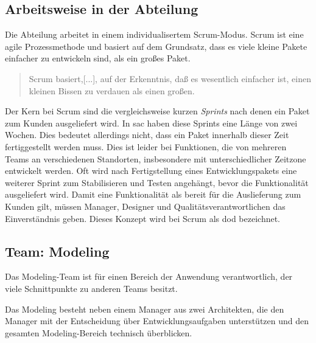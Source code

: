 \subsection{Arbeitsweise in der Abteilung}
Die Abteilung arbeitet in einem individualisertem Scrum-Modus. Scrum ist eine agile Prozessmethode und basiert 
auf dem Grundsatz, dass es viele kleine Pakete einfacher zu entwickeln sind, als ein großes Paket. 
\begin{quote} Scrum basiert,[...], auf der Erkenntnis, daß es wesentlich einfacher ist, einen kleinen Bissen zu verdauen als einen großen.\cite{scrum:2018} \end{quote} 
Der Kern bei Scrum sind die vergleichsweise kurzen \textit{Sprints} nach denen ein Paket zum Kunden ausgeliefert wird. 
In \ac{sac} haben diese Sprints eine Länge von zwei Wochen. Dies bedeutet allerdings nicht, dass ein Paket 
innerhalb dieser Zeit fertiggestellt werden muss. Dies ist leider bei Funktionen, die von mehreren Teams an
verschiedenen Standorten, insbesondere mit unterschiedlicher Zeitzone entwickelt werden. Oft wird nach Fertigstellung eines 
Entwicklungspakets eine weiterer Sprint zum Stabilisieren und Testen angehängt, bevor die Funktionalität ausgeliefert wird.
Damit eine Funktionalität als bereit für die Auslieferung zum Kunden gilt, müssen Manager, Designer und Qualitätsverantwortlichen das 
Einverständnis geben. Dieses Konzept wird bei Scrum als \ac{dod} bezeichnet. 

\subsection{Team: Modeling}
Das Modeling-Team ist für einen Bereich der Anwendung verantwortlich, der viele Schnittpunkte zu anderen Teams besitzt.

Das Modeling besteht neben einem Manager aus zwei Architekten, die den Manager mit der Entscheidung über 
Entwicklungsaufgaben unterstützen und den gesamten Modeling-Bereich technisch überblicken. 